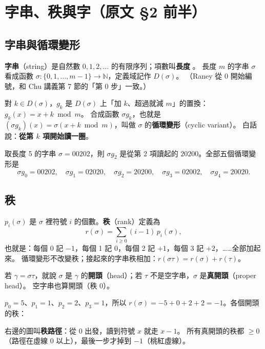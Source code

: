 \section{字串、秩與字（原文 §2 前半）}\label{sec:words}

\subsection{字串與循環變形}

\textbf{字串}（string）是自然數 $0,1,2,\ldots$ 的有限序列；項數叫\textbf{長度} 。
長度 $m$ 的字串 $\sigma$ 看成函數 $\sigma:\{0,1,\ldots,m-1\}\to\mathbb N$，定義域記作 $D(\sigma)$。
（Raney 從 0 開始編號，和 Chu 講義第 7 節的「第 0 步」一致。）

對 $k\in D(\sigma)$，$g_k$ 是 $D(\sigma)$ 上「加 $k$、超過就減 $m$」的置換：$g_k(x)=x+k\bmod m$。
合成函數 $\sigma g_k$，也就是 $(\sigma g_k)(x)=\sigma(x+k\bmod m)$，叫做 $\sigma$ 的\textbf{循環變形}（cyclic variant）。
白話說：\textbf{從第 $k$ 項開始讀一圈}。

\begin{exbox}[例]
取長度 5 的字串 $\sigma=00202$，則 $\sigma g_2$ 是從第 2 項讀起的 $20200$。全部五個循環變形是
\[
\sigma g_0=00202,\quad \sigma g_1=02020,\quad \sigma g_2=20200,\quad \sigma g_3=02002,\quad \sigma g_4=20020 .
\]
\end{exbox}

\subsection{秩}

$p_i(\sigma)$ 是 $\sigma$ 裡符號 $i$ 的個數。\textbf{秩}（rank）定義為
\[
r(\sigma)=\sum_{i\ge0}(i-1)\,p_i(\sigma),
\]
也就是：每個 0 記 $-1$，每個 1 記 $0$，每個 2 記 $+1$，每個 3 記 $+2$，……全部加起來。
循環變形不改變秩；接起來的字串秩相加：$r(\sigma\tau)=r(\sigma)+r(\tau)$。

若 $\gamma=\sigma\tau$，就說 $\sigma$ 是 $\gamma$ 的\textbf{開頭}（head）；若 $\tau$ 不是空字串，$\sigma$ 是\textbf{真開頭}（proper head）。
空字串也算開頭（秩 0）。

\begin{exbox}[例：$\sigma=230200010$]
$p_0=5$、$p_1=1$、$p_2=2$、$p_3=1$，所以 $r(\sigma)=-5+0+2+2=-1$。各個開頭的秩：
\begin{center}
\RanRankF
\end{center}
右邊的圖叫\textbf{秩路徑}：從 0 出發，讀到符號 $x$ 就走 $x-1$。
所有真開頭的秩都 $\ge0$（路徑在虛線 0 以上），最後一步才掉到 $-1$（桃紅虛線）。
\end{exbox}

